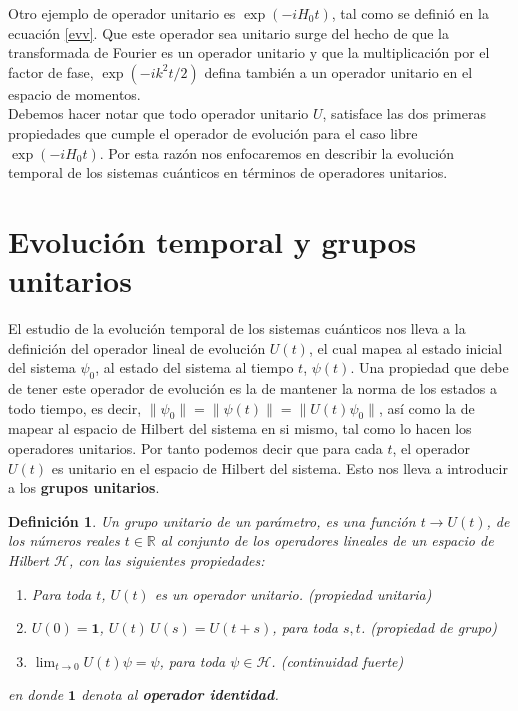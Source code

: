 \documentclass[12pt]{book}
\numberwithin{equation}{chapter}
\newtheorem{definition}[theorem]{Definici\'on}
\def\R{\mathbb{R}}
\def\rar{\rightarrow}
\def\H{\mathcal{H}}
\def\1{\mathbf{1}}
\begin{document}
Otro ejemplo de operador unitario es $\exp( -i H_{0}t )$, tal como se defini\'o en la ecuaci\'on \eqref{evv}. Que este operador sea unitario surge del hecho de que la transformada de Fourier es un operador unitario y que la multiplicaci\'on por el factor de fase, $\exp ( -i k^{2}t/2 )$ defina tambi\'en a un operador unitario en el espacio de momentos.\\

Debemos hacer notar que todo operador unitario $U$, satisface las dos primeras propiedades que cumple el operador de evoluci\'on para el caso libre $\exp( -i H_{0}t )$. Por esta raz\'on nos enfocaremos en describir la evoluci\'on temporal de los sistemas cu\'anticos en t\'erminos de operadores unitarios.\\

\section{Evoluci\'on temporal y grupos unitarios}
El estudio de la evoluci\'on temporal de los sistemas cu\'anticos nos lleva a la definici\'on del operador lineal de evoluci\'on $U(t)$, el cual mapea al estado inicial del sistema $\psi_{0}$, al estado del sistema al tiempo $t$, $\psi(t)$. Una propiedad que debe de tener este operador de evoluci\'on es la de mantener la norma de los estados a todo tiempo, es decir, $\| \psi_{0} \| = \| \psi(t) \|= \| U(t)\psi_{0} \|$, as\'i como la de mapear al espacio de Hilbert del sistema en si mismo, tal como lo hacen los operadores unitarios. Por tanto podemos decir que para cada $t$, el operador $U(t)$ es unitario en el espacio de Hilbert del sistema. Esto nos lleva a introducir a los {\bf grupos unitarios}. 

\begin{definition}
Un grupo unitario de un par\'ametro, es una funci\'on $t \rar U(t)$, de los n\'umeros reales $t \in \R$ al conjunto de los operadores lineales de un espacio de Hilbert $\H$, con las siguientes propiedades:
\begin{enumerate}
\item Para toda $t$, $U(t)$ es un operador unitario. (propiedad unitaria)
\item $U(0)= \1$, $U(t) \, U(s)= U(t+s)$, para toda $s,t$. (propiedad de grupo) 
\item $\lim_{t \rar 0} U(t) \psi = \psi$, para toda $\psi \in \H$. (continuidad fuerte)
\end{enumerate}
en donde $\1$ denota al {\bf operador identidad}.
\end{definition}
\end{document}
